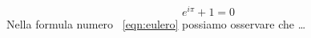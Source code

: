 \begin{equation}
  \label{eqn:eulero}
  e^{i\pi}+1=0
\end{equation}
Nella formula numero ~\eqref{eqn:eulero} 
possiamo osservare che \dots
